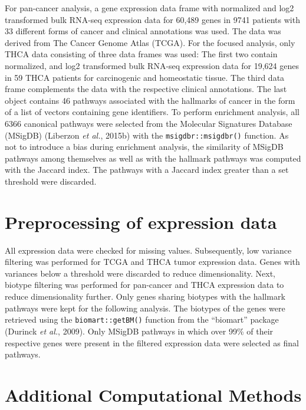 \documentclass[
  11pt,
  parskip,
  oneside]{scrreprt}
\begin{document}
For pan-cancer analysis, a gene expression data frame with normalized
and log2 transformed bulk RNA-seq expression data for 60,489 genes in
9741 patients with 33 different forms of cancer and clinical annotations
was used. The data was derived from The Cancer Genome Atlas (TCGA). For
the focused analysis, only THCA data consisting of three data frames was
used: The first two contain normalized, and log2 transformed bulk
RNA-seq expression data for 19,624 genes in 59 THCA patients for
carcinogenic and homeostatic tissue. The third data frame complements
the data with the respective clinical annotations. The last object
contains 46 pathways associated with the hallmarks of cancer in the form
of a list of vectors containing gene identifiers. To perform enrichment
analysis, all 6366 canonical pathways were selected from the Molecular
Signatures Database (MSigDB) (Liberzon \emph{et al.}, 2015b) with the
\texttt{msigdbr::msigdbr()} function. As not to introduce a bias during
enrichment analysis, the similarity of MSigDB pathways among themselves
as well as with the hallmark pathways was computed with the Jaccard
index. The pathways with a Jaccard index greater than a set threshold
were discarded.

\hypertarget{preprocessing-of-expression-data}{%
\section{Preprocessing of expression
data}\label{preprocessing-of-expression-data}}

All expression data were checked for missing values. Subsequently, low
variance filtering was performed for TCGA and THCA tumor expression
data. Genes with variances below a threshold were discarded to reduce
dimensionality. Next, biotype filtering was performed for pan-cancer and
THCA expression data to reduce dimensionality further. Only genes
sharing biotypes with the hallmark pathways were kept for the following
analysis. The biotypes of the genes were retrieved using the
\texttt{biomart::getBM()} function from the ``biomart'' package (Durinck
\emph{et al.}, 2009). Only MSigDB pathways in which over 99\% of their
respective genes were present in the filtered expression data were
selected as final pathways.

\hypertarget{additional-computational-methods}{%
\section{Additional Computational
Methods}\label{additional-computational-methods}}
\end{document}
